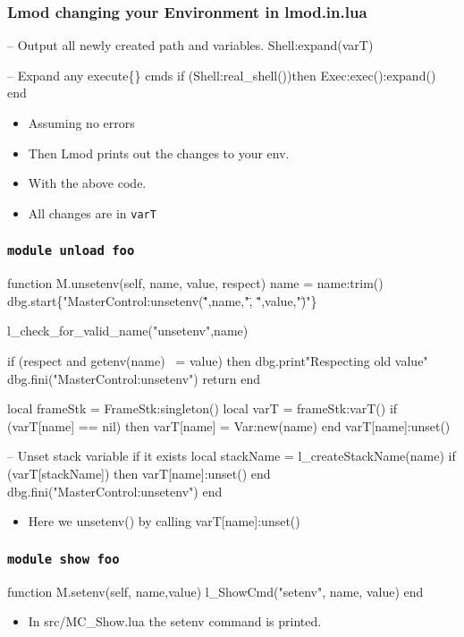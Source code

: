 \documentclass{beamer}
\begin{document}
\begin{frame}[fragile]
    \frametitle{Lmod changing your Environment in lmod.in.lua}
 {\tiny
    \begin{semiverbatim}
   -- Output all newly created path and variables.
   Shell:expand(varT)

   -- Expand any execute\{\} cmds
   if (Shell:real\_shell())then
      Exec:exec():expand()
   end
    \end{semiverbatim}
}
  \begin{itemize}
    \item Assuming no errors
    \item Then Lmod prints out the changes to your env.
    \item With the above code.
    \item All changes are in \texttt{varT}
  \end{itemize}

\end{frame}

\begin{frame}[fragile]
    \frametitle{\texttt{module unload foo}}
 {\tiny
    \begin{semiverbatim}
function M.unsetenv(self, name, value, respect)
   name = name:trim()
   dbg.start\{"MasterControl:unsetenv(\"",name,"\", \"",value,"\")"\}

   l_check_for_valid_name("unsetenv",name)

   if (respect and getenv(name) ~= value) then
      dbg.print{"Respecting old value"}
      dbg.fini("MasterControl:unsetenv")
      return
   end

   local frameStk  = FrameStk:singleton()
   local varT      = frameStk:varT()
   if (varT[name] == nil) then
      varT[name]   = Var:new(name)
   end
   varT[name]:unset()

   -- Unset stack variable if it exists
   local stackName = l_createStackName(name)
   if (varT[stackName]) then
      varT[name]:unset()
   end
   dbg.fini("MasterControl:unsetenv")
end
    \end{semiverbatim}
}
  \begin{itemize}
    \item Here we unsetenv() by calling varT[name]:unset()
  \end{itemize}

\end{frame}

\begin{frame}[fragile]
    \frametitle{\texttt{module show foo}}
 {\tiny
    \begin{semiverbatim}
function M.setenv(self, name,value)
   l_ShowCmd("setenv", name, value)
end
    \end{semiverbatim}
}
  \begin{itemize}
    \item In src/MC\_Show.lua the setenv command is printed.
  \end{itemize}

\end{frame}
\end{document}
